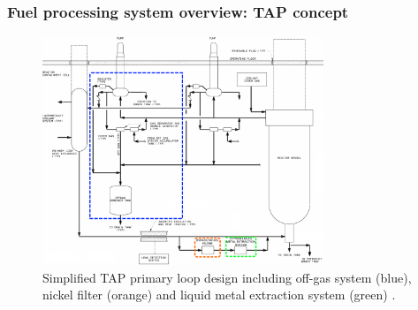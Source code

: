 \begin{frame}
\frametitle{Fuel processing system overview: TAP concept}
	\vspace{-2mm}
\begin{figure}[htp!] %
	\centering
	\includegraphics[width=0.75\textwidth]{../figures/tap_primary_loop.png}
	\caption{Simplified \gls{TAP} primary loop design including off-gas system 
		(blue), nickel filter (orange) and liquid metal extraction system 
		(green) \cite{transatomic_power_transatomic_2019}.}
\end{figure}

\end{frame}



